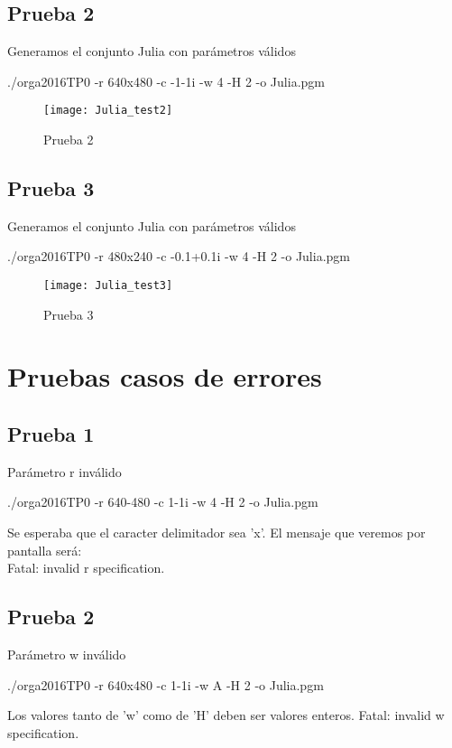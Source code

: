 \documentclass{article}
\begin{document}
\raggedright
\subsection{Prueba 2}
Generamos el conjunto Julia con par\'ametros v\'alidos
\begin{center}
    ./orga2016TP0 -r 640x480 -c -1-1i -w 4 -H 2 -o Julia.pgm
\end{center}
\begin{figure}[H]
  \begin{center}
  	\texttt{[image: Julia\_test2]}
  \end{center}
  \caption{Prueba 2}
\end{figure}

\raggedright
\subsection{Prueba 3}
Generamos el conjunto Julia con par\'ametros v\'alidos
\begin{center}
    ./orga2016TP0 -r 480x240 -c -0.1+0.1i -w 4 -H 2 -o Julia.pgm
\end{center}
\begin{figure}[H]
  \begin{center}
  	\texttt{[image: Julia\_test3]}
  \end{center}
  \caption{Prueba 3}
\end{figure}

\section{Pruebas casos de errores}
\raggedright
\subsection{Prueba 1}
Par\'ametro r inv\'alido
\begin{center}
    ./orga2016TP0 -r 640-480 -c 1-1i -w 4 -H 2 -o Julia.pgm\\
\end{center}
Se esperaba que el caracter delimitador sea 'x'. El mensaje que veremos por pantalla ser\'a:\\
\center
Fatal: invalid r specification.

\raggedright
\subsection{Prueba 2}
Par\'ametro w inv\'alido
\begin{center}
    ./orga2016TP0 -r 640x480 -c 1-1i -w A -H 2 -o Julia.pgm\\
\end{center}
Los valores tanto de 'w' como de 'H' deben ser valores enteros.
\center
Fatal: invalid w specification.
\end{document}
